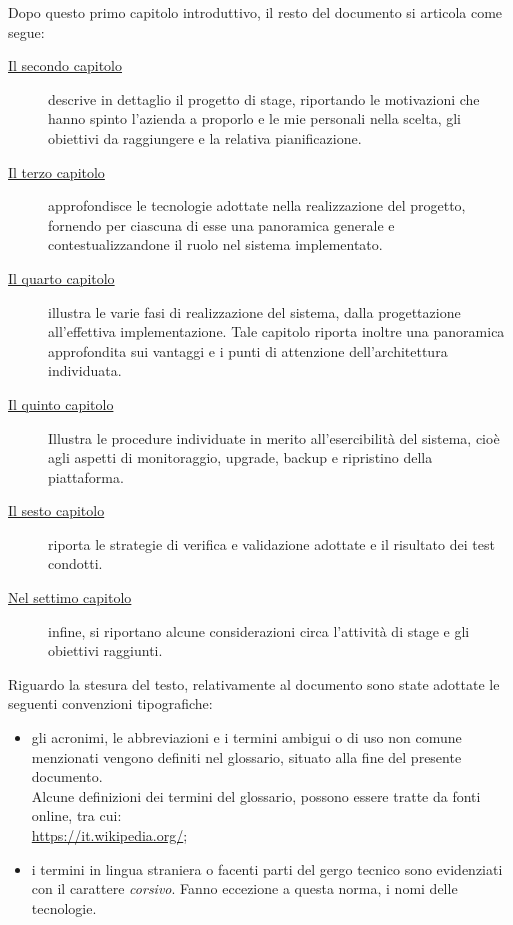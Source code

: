 Dopo questo primo capitolo introduttivo, il resto del documento si articola come segue:

\begin{description}
    
    \item[{\hyperref[cap:lo-stage]{Il secondo capitolo}}] descrive in dettaglio il progetto di stage, riportando le motivazioni che hanno spinto l'azienda a proporlo e le mie personali nella scelta, gli obiettivi da raggiungere e la relativa pianificazione.
    
    \item[{\hyperref[cap:tecnologie-adottate]{Il terzo capitolo}}] approfondisce le tecnologie adottate nella realizzazione del progetto, fornendo per ciascuna di esse una panoramica generale e contestualizzandone il ruolo nel sistema implementato.
    
    \item[{\hyperref[cap:realizzazione-del-sistema]{Il quarto capitolo}}] illustra le varie fasi di realizzazione del sistema, dalla progettazione all'effettiva implementazione. Tale capitolo riporta inoltre una panoramica approfondita sui vantaggi e i punti di attenzione dell'architettura individuata.
    
    \item[{\hyperref[cap:esercibilità]{Il quinto capitolo}}]Illustra le procedure individuate in merito all'esercibilità del sistema, cioè agli aspetti di monitoraggio, upgrade, backup e ripristino della piattaforma.
        
    \item[{\hyperref[cap:verifica-validazione]{Il sesto capitolo}}] riporta le strategie di verifica e validazione adottate e il risultato dei test condotti.
    
    \item[{\hyperref[cap:conclusioni]{Nel settimo capitolo}}] infine, si riportano alcune considerazioni circa l'attività di stage e gli obiettivi raggiunti.
\end{description}

Riguardo la stesura del testo, relativamente al documento sono state adottate le seguenti convenzioni tipografiche:
\begin{itemize}
	\item gli acronimi, le abbreviazioni e i termini ambigui o di uso non comune menzionati vengono definiti nel glossario, situato alla fine del presente documento. \\
    Alcune definizioni dei termini del glossario, possono essere tratte da fonti online, tra cui: \\ 
    \url{https://it.wikipedia.org/};
	\item i termini in lingua straniera o facenti parti del gergo tecnico sono evidenziati con il carattere \emph{corsivo}. Fanno eccezione a questa norma, i nomi delle tecnologie.
\end{itemize}